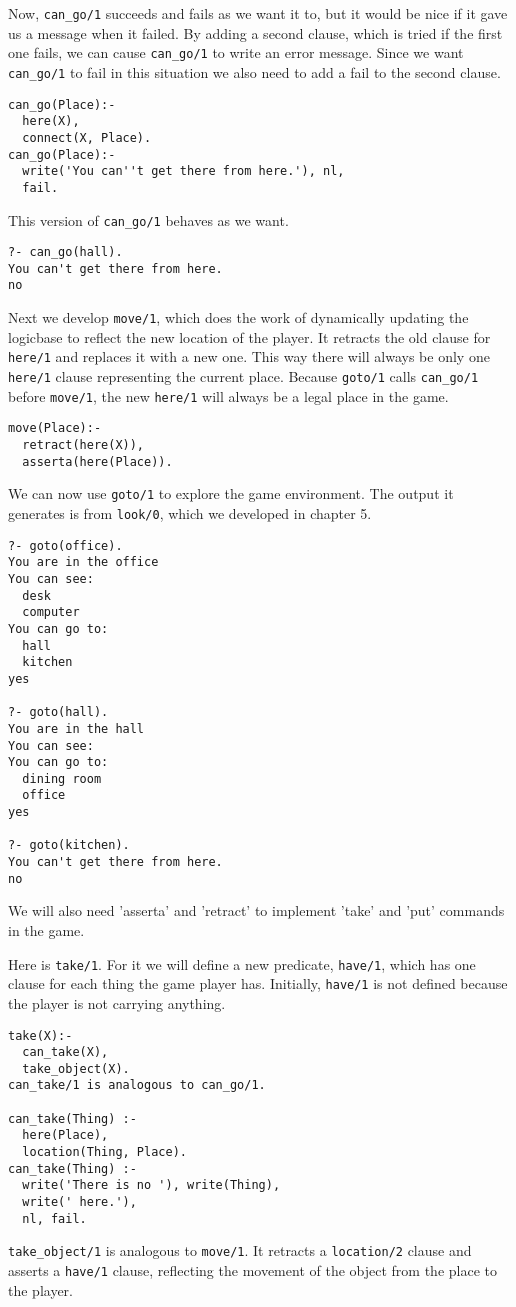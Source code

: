 Now, \verb'can_go/1' succeeds and fails as we want it to, but it would be nice
if it gave us a message when it failed. By adding a second clause, which is
tried if the first one fails, we can cause \verb'can_go/1' to write an error
message. Since we want \verb'can_go/1' to fail in this situation we also need to
add a fail to the second clause.

\begin{verbatim}
can_go(Place):-
  here(X),
  connect(X, Place).
can_go(Place):-
  write('You can''t get there from here.'), nl,
  fail.
\end{verbatim}
This version of \verb'can_go/1' behaves as we want.

\begin{verbatim}
?- can_go(hall).
You can't get there from here.
no
\end{verbatim}
Next we develop \verb'move/1', which does the work of dynamically updating the
logicbase to reflect the new location of the player. It retracts the old clause
for \verb'here/1' and replaces it with a new one. This way there will always be
only one \verb'here/1' clause representing the current place. Because
\verb'goto/1' calls \verb'can_go/1' before \verb'move/1', the new \verb'here/1'
will always be a legal place in the game.

\begin{verbatim}
move(Place):-
  retract(here(X)),
  asserta(here(Place)).
\end{verbatim}
We can now use \verb'goto/1' to explore the game environment. The output it
generates is from \verb'look/0', which we developed in chapter 5.

\begin{verbatim}
?- goto(office).
You are in the office
You can see:
  desk
  computer
You can go to:
  hall
  kitchen
yes

?- goto(hall).
You are in the hall
You can see:
You can go to:
  dining room
  office
yes

?- goto(kitchen).
You can't get there from here.
no
\end{verbatim}
We will also need 'asserta' and 'retract' to implement 'take' and 'put' commands
in the game.

Here is \verb'take/1'. For it we will define a new predicate, \verb'have/1',
which has one clause for each thing the game player has. Initially,
\verb'have/1' is not defined because the player is not carrying anything.

\begin{verbatim}
take(X):-  
  can_take(X),
  take_object(X).
can_take/1 is analogous to can_go/1.

can_take(Thing) :-
  here(Place),
  location(Thing, Place).
can_take(Thing) :-
  write('There is no '), write(Thing),
  write(' here.'),
  nl, fail.
\end{verbatim}
\verb'take_object/1' is analogous to \verb'move/1'. It retracts a
\verb'location/2' clause and asserts a \verb'have/1' clause, reflecting the
movement of the object from the place to the player.

